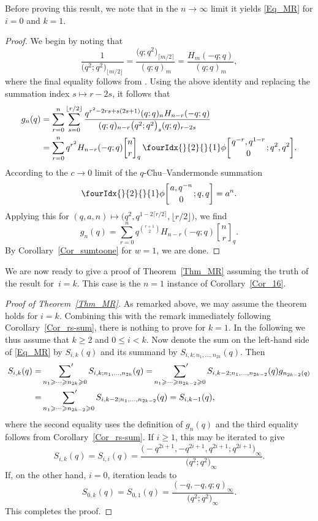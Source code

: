 \documentclass[pdftex]{sigma}
\numberwithin{equation}{section}
\newcommand{\qhyp}[5]{\fourIdx{}{#1}{}{#2}\phi
\bigg[\genfrac{}{}{0pt}{}{#3}{#4};#5\bigg]}
\renewcommand{\leq}{\leqslant}
\renewcommand{\geq}{\geqslant}
\newcommand{\ceil}[1]{\lceil#1\rceil}
\newcommand{\floor}[1]{\lfloor#1\rfloor}
\newcommand{\qbin}[2]{\genfrac{[}{]}{0pt}{}{#1}{#2}}
\begin{document}
Before proving this result, we note that in the $n\to\infty$ limit it
yields \eqref{Eq_MR} for $i=0$ and $k=1$.

\begin{proof}
We begin by noting that
\[
\frac{1}{\bigl(q^2;q^2\bigr)_{\floor{m/2}}}=\frac{\bigl(q;q^2\bigr)_{\ceil{m/2}}}{(q;q)_m}
=\frac{H_m(-q;q)}{(q;q)_m},
\]
where the final equality follows from \cite[equation~(1.10c)]{W06a}.
Using the above identity and replacing the summation index
$s\mapsto r-2s$, it follows that
\begin{align*}
g_n(q)&=\sum_{r=0}^n \sum_{s=0}^{\floor{r/2}}
\frac{q^{r^2-2rs+s(2s+1)} (q;q)_n H_{n-r}(-q;q)}
{(q;q)_{n-r}\bigl(q^2;q^2\bigr)_s(q;q)_{r-2s}} \\
&=\sum_{r=0}^n q^{r^2} H_{n-r}(-q;q) \qbin{n}{r}_q\,
\qhyp{2}{1}{q^{-r},q^{1-r}}{0}{q^2,q^2}.
\end{align*}
According to the $c\to 0$ limit of the $q$-Chu--Vandermonde summation
\cite[equation~(II.6)]{GR04}
\[
\qhyp{2}{1}{a,q^{-n}}{0}{q,q}=a^n.
\]
Applying this for $(q,a,n)\mapsto \bigl(q^2,q^{1-2\ceil{r/2}},\floor{r/2}\bigr)$,
we find
\[
g_n(q)=\sum_{r=0}^n q^{\binom{r+1}{2}} H_{n-r}(-q;q) \qbin{n}{r}_q.
\]
By Corollary~\ref{Cor_sumtoone} for $w=1$, we are done.
\end{proof}

We are now ready to give a proof of Theorem~\ref{Thm_MR}
assuming the truth of the result for~${i=k}$.
This case is the $n=1$ instance of Corollary~\ref{Cor_16}.

\begin{proof}[Proof of Theorem~\ref{Thm_MR}]
As remarked above, we may assume the theorem holds for $i=k$.
Combining this with the remark immediately following
Corollary~\ref{Cor_rs-sum}, there is nothing to prove for $k=1$.
In the following we thus assume that $k\geq 2$ and $0\leq i<k$.
Now denote the sum on the left-hand side of \eqref{Eq_MR}
by $S_{i,k}(q)$ and its summand by $S_{i,k;n_1,\dots,n_{2k}}(q)$.
Then
\begin{align*}
S_{i,k}(q)&=\sideset{}{'}\sum_{n_1\geq\cdots\geq n_{2k}\geq 0}
S_{i,k;n_1,\dots,n_{2k}}(q) =\sideset{}{'}\sum_{n_1\geq\cdots\geq n_{2k-2}\geq 0}
S_{i,k-2;n_1,\dots,n_{2k-2}}(q) g_{n_{2k-2}(q)} \\
&=\sideset{}{'}\sum_{n_1\geq\cdots\geq n_{2k-2}\geq 0}
S_{i,k-2;n_1,\dots,n_{2k-2}}(q) =S_{i,k-1}(q),
\end{align*}
where the second equality uses the definition of $g_n(q)$
and the third equality follows from Corollary~\ref{Cor_rs-sum}.
If $i\geq 1$, this may be iterated to give
\[
S_{i,k}(q)=S_{i,i}(q)
=\frac{\bigl(-q^{2i+1},-q^{2i+1},q^{2i+1};q^{2i+1}\bigr)_{\infty}}
{\bigl(q^2;q^2\bigr)_{\infty}}.
\]
If, on the other hand, $i=0$, iteration leads to
\[
S_{0,k}(q)=S_{0,1}(q)=
\frac{(-q,-q,q;q)_{\infty}}{\bigl(q^2;q^2\bigr)_{\infty}}.
\]
This completes the proof.
\end{proof}
\end{document}
